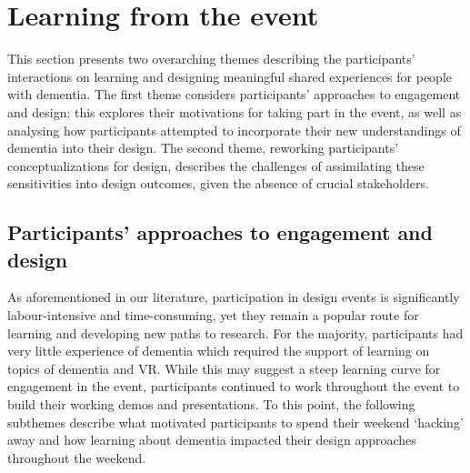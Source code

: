 \section{Learning from the event}
\label{sec:LearningEvent}
This section presents two overarching themes describing the participants' interactions on learning and designing meaningful shared experiences for people with dementia. The first theme considers participants' approaches to engagement and design: this explores their motivations for taking part in the event, as well as analysing how participants attempted to incorporate their new understandings of dementia into their design. The second theme, reworking participants’ conceptualizations for design, describes the challenges of assimilating these sensitivities into design outcomes, given the absence of crucial stakeholders.
\subsection{Participants' approaches to engagement and design}
\label{LearningEvent:ThemeOne}
As aforementioned in our literature, participation in design events is significantly labour-intensive and time-consuming, yet they remain a popular route for learning and developing new paths to research. For the majority, participants had very little experience of dementia which required the support of learning on topics of dementia and VR. While this may suggest a steep learning curve for engagement in the event, participants continued to work throughout the event to build their working demos and presentations. To this point, the following subthemes describe what motivated participants to spend their weekend ‘hacking’ away and how learning about dementia impacted their design approaches throughout the weekend.
